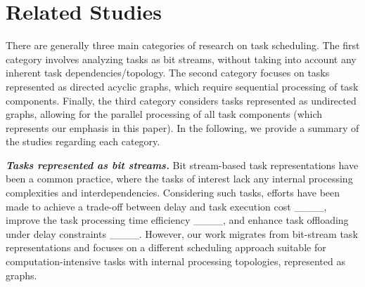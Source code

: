 \section{Related Studies}
There are generally three main categories of research on task scheduling. The first category involves analyzing tasks as bit streams, without taking into account any inherent task dependencies/topology. The second category focuses on tasks represented as directed acyclic graphs, which require sequential processing of task components. Finally, the third category considers tasks represented as undirected graphs, allowing for the parallel processing of all task components (which represents our emphasis in this paper). In the following, we provide a summary of the studies regarding each category.

\noindent
\textit{\textbf{Tasks represented as bit streams. }}Bit stream-based task representations have been a common practice, where the tasks of interest lack any internal processing complexities and interdependencies. Considering such tasks, efforts have been made to achieve a trade-off between delay and task execution cost ____, improve the task processing time efficiency ____, and enhance task offloading under delay constraints ____. However, our work migrates from bit-stream task representations and focuses on a different scheduling approach suitable for computation-intensive tasks with internal processing topologies, represented as graphs.

